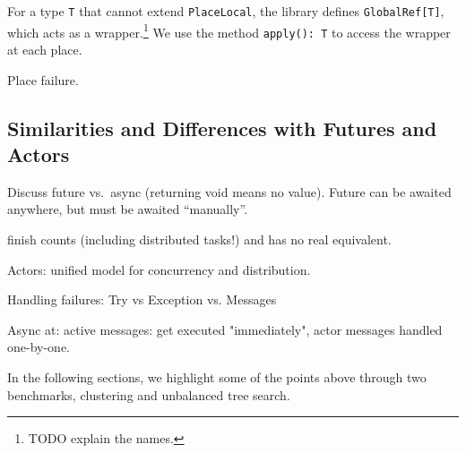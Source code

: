 For a type \lstinline{T} that cannot extend \lstinline{PlaceLocal}, the library
defines \lstinline{GlobalRef[T]}, which acts as a wrapper.\footnote{TODO
explain the names.} We use the method \lstinline{apply(): T} to access the
wrapper at each place.


Place failure.

\subsection{Similarities and Differences with Futures and Actors}

Discuss future vs.\ async (returning void means no value). Future can be awaited anywhere, but must be awaited ``manually''.

finish counts (including distributed tasks!) and has no real equivalent.

Actors: unified model for concurrency and distribution.

Handling failures: Try vs Exception vs. Messages

Async at: active messages: get executed "immediately", actor messages handled one-by-one.

In the following sections, we highlight some of the points above through two
benchmarks, \kmeans clustering and unbalanced tree search.


% 

